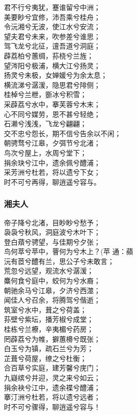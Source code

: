 \documentclass[]{article}
\begin{document}
君不行兮夷犹，蹇谁留兮中洲；\\
美要眇兮宜修，沛吾乘兮桂舟；\\
令沅湘兮无波，使江水兮安流；\\
望夫君兮未来，吹参差兮谁思；\\
驾飞龙兮北征，邅吾道兮洞庭；\\
薜荔柏兮蕙绸，荪桡兮兰旌；\\
望涔阳兮极浦，横大江兮扬灵；\\
扬灵兮未极，女婵媛兮为余太息；\\
横流涕兮潺湲，隐思君兮陫侧；\\
桂棹兮兰枻，斵冰兮积雪；\\
采薜荔兮水中，搴芙蓉兮木末；\\
心不同兮媒劳，恩不甚兮轻绝；\\
石濑兮浅浅，飞龙兮翩翩；\\
交不忠兮怨长，期不信兮告余以不闲；\\
朝骋骛兮江皋，夕弭节兮北渚；\\
鸟次兮屋上，水周兮堂下；\\
捐余玦兮江中，遗余佩兮醴浦；\\
采芳洲兮杜若，将以遗兮下女；\\
时不可兮再得，聊逍遥兮容与。

\hypertarget{header-n2792}{%
\subsubsection{湘夫人}\label{header-n2792}}

帝子降兮北渚，目眇眇兮愁予；\\
袅袅兮秋风，洞庭波兮木叶下；\\
登白薠兮骋望，与佳期兮夕张；\\
鸟何萃兮苹中，罾何为兮木上？(苹 通：蘋\\
沅有茝兮醴有兰，思公子兮未敢言；\\
荒忽兮远望，观流水兮潺湲；\\
麋何食兮庭中，蛟何为兮水裔；\\
朝驰余马兮江皋，夕济兮西澨；\\
闻佳人兮召余，将腾驾兮偕逝；\\
筑室兮水中，葺之兮荷盖；\\
荪壁兮紫坛，播芳椒兮成堂；\\
桂栋兮兰橑，辛夷楣兮药房；\\
罔薜荔兮为帷，擗蕙櫋兮既张；\\
白玉兮为镇，疏石兰兮为芳；\\
芷葺兮荷屋，缭之兮杜衡；\\
合百草兮实庭，建芳馨兮庑门；\\
九嶷缤兮并迎，灵之来兮如云；\\
捐余袂兮江中，遗余褋兮醴浦；\\
搴汀洲兮杜若，将以遗兮远者；\\
时不可兮骤得，聊逍遥兮容与！
\end{document}
